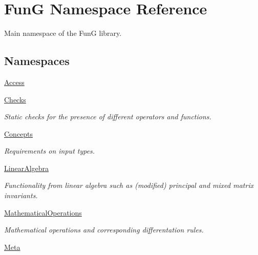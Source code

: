 \hypertarget{namespaceFunG}{\section{Fun\-G Namespace Reference}
\label{namespaceFunG}
}


Main namespace of the Fun\-G library.  


\subsection*{Namespaces}
\begin{DoxyCompactItemize}
\item 
\hyperlink{namespaceFunG_1_1Access}{Access}
\item 
\hyperlink{namespaceFunG_1_1Checks}{Checks}
\begin{DoxyCompactList}\small\item\em Static checks for the presence of different operators and functions. \end{DoxyCompactList}\item 
\hyperlink{namespaceFunG_1_1Concepts}{Concepts}
\begin{DoxyCompactList}\small\item\em Requirements on input types. \end{DoxyCompactList}\item 
\hyperlink{namespaceFunG_1_1LinearAlgebra}{Linear\-Algebra}
\begin{DoxyCompactList}\small\item\em Functionality from linear algebra such as (modified) principal and mixed matrix invariants. \end{DoxyCompactList}\item 
\hyperlink{namespaceFunG_1_1MathematicalOperations}{Mathematical\-Operations}
\begin{DoxyCompactList}\small\item\em Mathematical operations and corresponding differentation rules. \end{DoxyCompactList}\item 
\hyperlink{namespaceFunG_1_1Meta}{Meta}
\end{DoxyCompactItemize}
